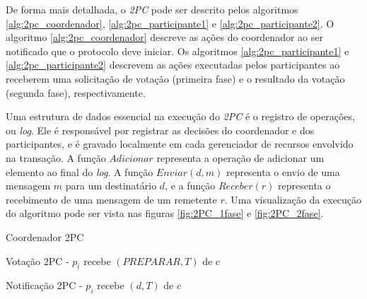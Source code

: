 \documentclass[11pt,twoside,a4paper]{book}
\begin{document}
De forma mais detalhada, o \emph{2PC} pode ser descrito pelos algoritmos \ref{alg:2pc_coordenador}, \ref{alg:2pc_participante1} e \ref{alg:2pc_participante2}. O algoritmo \ref{alg:2pc_coordenador} descreve as ações do coordenador ao ser notificado que o protocolo deve iniciar. Os algoritmos \ref{alg:2pc_participante1} e \ref{alg:2pc_participante2} descrevem as ações executadas pelos participantes ao receberem uma solicitação de votação (primeira fase) e o resultado da votação (segunda fase), respectivamente. 

Uma estrutura de dados essencial na execução do \emph{2PC} é o registro de operações, ou \emph{log}. Ele é responsável por registrar as decisões do coordenador e dos participantes, e é gravado localmente em cada gerenciador de recursos envolvido na transação. A função $Adicionar$ representa a operação de adicionar um elemento ao final do \emph{log}. A função $Enviar(d, m)$ representa o envio de uma mensagem $m$ para um destinatário $d$, e a função $Receber(r)$ representa o recebimento de uma mensagem de um remetente $r$. Uma visualização da execução do algoritmo pode ser vista nas figuras \ref{fig:2PC_1fase} e \ref{fig:2PC_2fase}.

\begin{algorithm}
\caption{Coordenador 2PC}
\label{alg:2pc_coordenador}
\dontprintsemicolon
{}
\end{algorithm}

\begin{algorithm}
\caption{Votação 2PC - $p_i$ recebe $(PREPARAR, T)$ de $c$}
\label{alg:2pc_participante1}
\dontprintsemicolon
{}
\end{algorithm}

\begin{algorithm}
\caption{Notificação 2PC - $p_i$ recebe $(d, T)$ de $c$}
\label{alg:2pc_participante2}
\dontprintsemicolon
{}
\end{algorithm}
\end{document}
